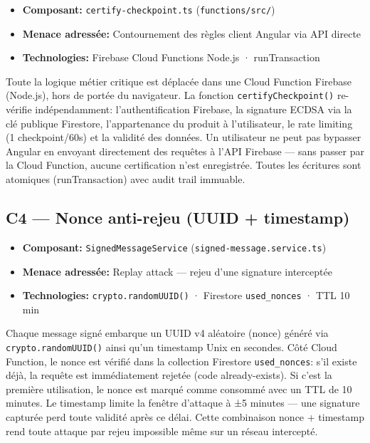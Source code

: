 \documentclass[12pt,a4paper]{report}
\begin{document}
\begin{tcolorbox}[definbox,title={Couche C3 --- Validation serveur Cloud Functions}]
  \begin{itemize}[itemsep=5pt]
    \item \textbf{Composant:} \texttt{certify-checkpoint.ts} (\texttt{functions/src/})
    \item \textbf{Menace adressée:} Contournement des règles client Angular via API directe
    \item \textbf{Technologies:} Firebase Cloud Functions Node.js · runTransaction
  \end{itemize}
  \vspace{0.3cm}
  Toute la logique métier critique est déplacée dans une Cloud Function Firebase (Node.js),
  hors de portée du navigateur. La fonction \texttt{certifyCheckpoint()} re-vérifie
  indépendamment: l'authentification Firebase, la signature ECDSA via la clé publique
  Firestore, l'appartenance du produit à l'utilisateur, le rate limiting (1 checkpoint/60s)
  et la validité des données. Un utilisateur ne peut pas bypasser Angular en envoyant
  directement des requêtes à l'API Firebase --- sans passer par la Cloud Function, aucune
  certification n'est enregistrée. Toutes les écritures sont atomiques (runTransaction)
  avec audit trail immuable.
\end{tcolorbox}

\vspace{0.3cm}

\subsection{C4 — Nonce anti-rejeu (UUID + timestamp)}

\begin{tcolorbox}[definbox,title={Couche C4 --- Nonce anti-rejeu}]
  \begin{itemize}[itemsep=5pt]
    \item \textbf{Composant:} \texttt{SignedMessageService} (\texttt{signed-message.service.ts})
    \item \textbf{Menace adressée:} Replay attack --- rejeu d'une signature interceptée
    \item \textbf{Technologies:} \texttt{crypto.randomUUID()} · Firestore \texttt{used\_nonces} · TTL 10 min
  \end{itemize}
  \vspace{0.3cm}
  Chaque message signé embarque un UUID v4 aléatoire (nonce) généré via \texttt{crypto.randomUUID()}
  ainsi qu'un timestamp Unix en secondes. Côté Cloud Function, le nonce est vérifié dans la
  collection Firestore \texttt{used\_nonces}: s'il existe déjà, la requête est immédiatement
  rejetée (code already-exists). Si c'est la première utilisation, le nonce est marqué comme
  consommé avec un TTL de 10 minutes. Le timestamp limite la fenêtre d'attaque à ±5 minutes
  --- une signature capturée perd toute validité après ce délai. Cette combinaison nonce +
  timestamp rend toute attaque par rejeu impossible même sur un réseau intercepté.
\end{tcolorbox}
\end{document}

